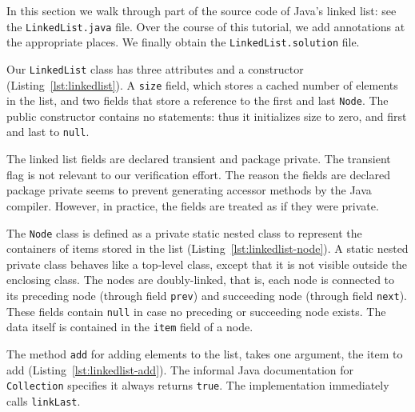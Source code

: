 \documentclass[runningheads]{llncs}
\begin{document}
In this section we walk through part of the source code of Java's linked list: see the \texttt{LinkedList.java} file. Over the course of this tutorial, we add annotations at the appropriate places. We finally obtain the \texttt{LinkedList.solution} file.



Our \texttt{LinkedList} class has three attributes and a constructor (Listing~\ref{lst:linkedlist}). A \texttt{size} field, which stores a cached number of elements in the list, and two fields that store a reference to the first and last \texttt{Node}. The public constructor contains no statements: thus it initializes size to zero, and first and last to \texttt{null}.

The linked list fields are declared transient and package private. The transient flag is not relevant to our verification effort. The reason the fields are declared package private seems to prevent generating accessor methods by the Java compiler. However, in practice, the fields are treated as if they were private.



The \texttt{Node} class is defined as a private static nested class to represent the containers of items stored in the list (Listing~\ref{lst:linkedlist-node}). A static nested private class behaves like a top-level class, except that it is not visible outside the enclosing class. The nodes are doubly-linked, that is, each node is connected to its preceding node (through field \texttt{prev}) and succeeding node (through field \texttt{next}). These fields contain \texttt{null} in case no preceding or succeeding node exists. The data itself is contained in the \texttt{item} field of a node.



The method \texttt{add} for adding elements to the list, takes one argument, the item to add (Listing~\ref{lst:linkedlist-add}). The informal Java documentation for \texttt{Collection} specifies it always returns \texttt{true}. The implementation immediately calls \texttt{linkLast}.
\end{document}
